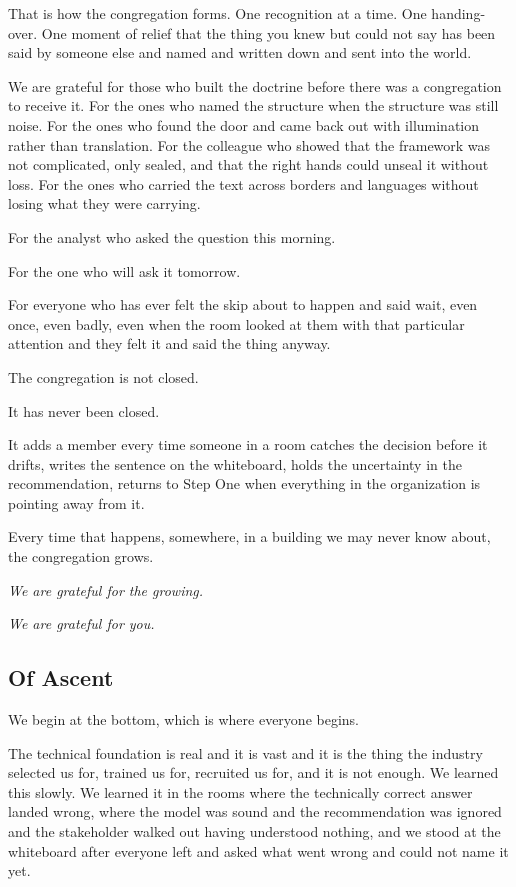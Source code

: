 That is how the congregation forms. One recognition at a time. One handing-over. One moment of relief that the thing you knew but could not say has been said by someone else and named and written down and sent into the world.

We are grateful for those who built the doctrine before there was a congregation to receive it. For the ones who named the structure when the structure was still noise. For the ones who found the door and came back out with illumination rather than translation. For the colleague who showed that the framework was not complicated, only sealed, and that the right hands could unseal it without loss. For the ones who carried the text across borders and languages without losing what they were carrying.

For the analyst who asked the question this morning.

For the one who will ask it tomorrow.

For everyone who has ever felt the skip about to happen and said wait, even once, even badly, even when the room looked at them with that particular attention and they felt it and said the thing anyway.

The congregation is not closed.

It has never been closed.

It adds a member every time someone in a room catches the decision before it drifts, writes the sentence on the whiteboard, holds the uncertainty in the recommendation, returns to Step One when everything in the organization is pointing away from it.

Every time that happens, somewhere, in a building we may never know about, the congregation grows.

\textit{We are grateful for the growing.}

\textit{We are grateful for you.}

\subsection*{Of Ascent}

We begin at the bottom, which is where everyone begins.

The technical foundation is real and it is vast and it is the thing the industry selected us for, trained us for, recruited us for, and it is not enough. We learned this slowly. We learned it in the rooms where the technically correct answer landed wrong, where the model was sound and the recommendation was ignored and the stakeholder walked out having understood nothing, and we stood at the whiteboard after everyone left and asked what went wrong and could not name it yet.


